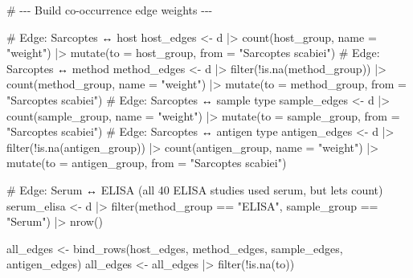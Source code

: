 \documentclass[
  letterpaper,
  DIV=11,
  numbers=noendperiod]{scrartcl}
\newenvironment{Shaded}{\begin{snugshade}}{\end{snugshade}}
\newcommand{\AttributeTok}[1]{\textcolor[rgb]{0.40,0.45,0.13}{#1}}
\newcommand{\CommentTok}[1]{\textcolor[rgb]{0.37,0.37,0.37}{#1}}
\newcommand{\FunctionTok}[1]{\textcolor[rgb]{0.28,0.35,0.67}{#1}}
\newcommand{\NormalTok}[1]{\textcolor[rgb]{0.00,0.23,0.31}{#1}}
\newcommand{\OtherTok}[1]{\textcolor[rgb]{0.00,0.23,0.31}{#1}}
\newcommand{\SpecialCharTok}[1]{\textcolor[rgb]{0.37,0.37,0.37}{#1}}
\newcommand{\StringTok}[1]{\textcolor[rgb]{0.13,0.47,0.30}{#1}}
\begin{document}
\begin{Shaded}
\begin{Highlighting}[]
\CommentTok{\# {-}{-}{-} Build co{-}occurrence edge weights {-}{-}{-}}

\CommentTok{\# Edge: Sarcoptes ↔ host}
\NormalTok{host\_edges }\OtherTok{\textless{}{-}}\NormalTok{ d }\SpecialCharTok{|\textgreater{}} \FunctionTok{count}\NormalTok{(host\_group, }\AttributeTok{name =} \StringTok{"weight"}\NormalTok{) }\SpecialCharTok{|\textgreater{}} \FunctionTok{mutate}\NormalTok{(}\AttributeTok{to =}\NormalTok{ host\_group, }\AttributeTok{from =} \StringTok{"Sarcoptes scabiei"}\NormalTok{)}
\CommentTok{\# Edge: Sarcoptes ↔ method}
\NormalTok{method\_edges }\OtherTok{\textless{}{-}}\NormalTok{ d }\SpecialCharTok{|\textgreater{}} \FunctionTok{filter}\NormalTok{(}\SpecialCharTok{!}\FunctionTok{is.na}\NormalTok{(method\_group)) }\SpecialCharTok{|\textgreater{}} \FunctionTok{count}\NormalTok{(method\_group, }\AttributeTok{name =} \StringTok{"weight"}\NormalTok{) }\SpecialCharTok{|\textgreater{}} \FunctionTok{mutate}\NormalTok{(}\AttributeTok{to =}\NormalTok{ method\_group, }\AttributeTok{from =} \StringTok{"Sarcoptes scabiei"}\NormalTok{)}
\CommentTok{\# Edge: Sarcoptes ↔ sample type}
\NormalTok{sample\_edges }\OtherTok{\textless{}{-}}\NormalTok{ d }\SpecialCharTok{|\textgreater{}} \FunctionTok{count}\NormalTok{(sample\_group, }\AttributeTok{name =} \StringTok{"weight"}\NormalTok{) }\SpecialCharTok{|\textgreater{}} \FunctionTok{mutate}\NormalTok{(}\AttributeTok{to =}\NormalTok{ sample\_group, }\AttributeTok{from =} \StringTok{"Sarcoptes scabiei"}\NormalTok{)}
\CommentTok{\# Edge: Sarcoptes ↔ antigen type}
\NormalTok{antigen\_edges }\OtherTok{\textless{}{-}}\NormalTok{ d }\SpecialCharTok{|\textgreater{}} \FunctionTok{filter}\NormalTok{(}\SpecialCharTok{!}\FunctionTok{is.na}\NormalTok{(antigen\_group)) }\SpecialCharTok{|\textgreater{}} \FunctionTok{count}\NormalTok{(antigen\_group, }\AttributeTok{name =} \StringTok{"weight"}\NormalTok{) }\SpecialCharTok{|\textgreater{}} \FunctionTok{mutate}\NormalTok{(}\AttributeTok{to =}\NormalTok{ antigen\_group, }\AttributeTok{from =} \StringTok{"Sarcoptes scabiei"}\NormalTok{)}

\CommentTok{\# Edge: Serum ↔ ELISA (all 40 ELISA studies used serum, but let\textquotesingle{}s count)}
\NormalTok{serum\_elisa }\OtherTok{\textless{}{-}}\NormalTok{ d }\SpecialCharTok{|\textgreater{}} \FunctionTok{filter}\NormalTok{(method\_group }\SpecialCharTok{==} \StringTok{"ELISA"}\NormalTok{, sample\_group }\SpecialCharTok{==} \StringTok{"Serum"}\NormalTok{) }\SpecialCharTok{|\textgreater{}} \FunctionTok{nrow}\NormalTok{()}

\NormalTok{all\_edges }\OtherTok{\textless{}{-}} \FunctionTok{bind\_rows}\NormalTok{(host\_edges, method\_edges, sample\_edges, antigen\_edges)}
\NormalTok{all\_edges }\OtherTok{\textless{}{-}}\NormalTok{ all\_edges }\SpecialCharTok{|\textgreater{}} \FunctionTok{filter}\NormalTok{(}\SpecialCharTok{!}\FunctionTok{is.na}\NormalTok{(to))}
\end{Highlighting}
\end{Shaded}
\end{document}
